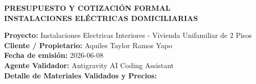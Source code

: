 \documentclass[11pt,a4paper]{article}
\begin{document}
\begin{center}
    {\LARGE\bfseries\color{navyblue} PRESUPUESTO Y COTIZACIÓN FORMAL}\\[0.2cm]
    {\large\bfseries INSTALACIONES ELÉCTRICAS DOMICILIARIAS}
\end{center}

\vspace{0.4cm}

\textbf{Proyecto:} Instalaciones Electricas Interiores - Vivienda Unifamiliar de 2 Pisos \\
\textbf{Cliente / Propietario:} Aquiles Taylor Ramos Yapo \\
\textbf{Fecha de emisión:} 2026-06-08 \\
\textbf{Agente Validador:} Antigravity AI Coding Assistant \\

\vspace{0.6cm}
\textbf{Detalle de Materiales Validados y Precios:}
\end{document}
